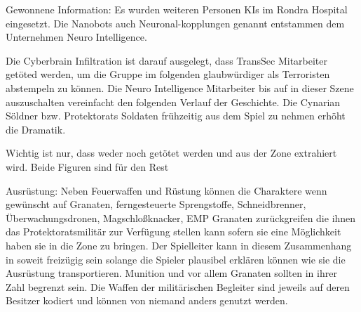 \begin{remarks}
	Gewonnene Information:  Es wurden weiteren Personen KIs im Rondra Hospital eingesetzt. Die Nanobots auch Neuronal-kopplungen genannt entstammen dem Unternehmen Neuro Intelligence. 

	Die Cyberbrain Infiltration ist darauf ausgelegt, dass TransSec Mitarbeiter getöted werden, um die Gruppe im folgenden glaubwürdiger als Terroristen abstempeln zu können. Die Neuro Intelligence Mitarbeiter bis auf \ml{} in dieser Szene auszuschalten vereinfacht den folgenden Verlauf der Geschichte. Die Cynarian Söldner bzw. Protektorats Soldaten frühzeitig aus dem Spiel zu nehmen erhöht die Dramatik.
	
	Wichtig ist nur, dass weder \xl{} noch \ml{} getötet werden und \ml{} aus der Zone extrahiert wird. Beide Figuren sind für den Rest 

	Ausrüstung: Neben Feuerwaffen und Rüstung können die Charaktere wenn gewünscht auf Granaten, ferngesteuerte Sprengstoffe, Schneidbrenner, Überwachungsdronen, Magschloßknacker, EMP Granaten zurückgreifen die ihnen das Protektoratsmilitär zur Verfügung stellen kann sofern sie eine Möglichkeit haben sie in die Zone zu bringen. Der Spielleiter kann in diesem Zusammenhang in soweit freizügig sein solange die Spieler plausibel erklären können wie sie die Ausrüstung transportieren. Munition und vor allem Granaten sollten in ihrer Zahl begrenzt sein. Die Waffen der militärischen Begleiter sind jeweils auf deren Besitzer kodiert und können von
 	niemand anders genutzt werden.
\end{remarks}

